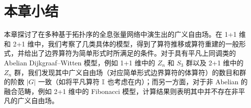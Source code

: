 \section{本章小结}

本章探讨了在多种基于拓扑序的全息张量网络中演生出的广义自由场。在 1+1 维和 2+1 维中，我们考察了几类具体的模型，得到了算符推移或算符重建的一般形式，并给出了边界算符为简单形式时所满足的条件。对于具有平凡上同调类的 Abelian Dijkgraaf--Witten 模型，例如 1+1 维中的 $Z_n$ 和 $S_3$ 群以及 2+1 维中的 $Z_n$ 群，我们发现其中广义自由场（对应简单形式边界算符的体算符）的数目和群的阶数 $|G|$ 一致（如将平凡算符 $\mathbb{I}$ 也考虑在内）；而另一方面，对于非 Abelian 的融合范畴，例如 2+1 维中的 Fibonacci 模型，计算结果则表明其中并不存在非平凡的广义自由场。
